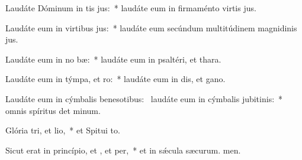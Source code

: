 \item Laudáte Dóminum in tis jus:~* laudáte eum in firmaménto virtis jus.
\item Laudáte eum in virtibus jus:~* laudáte eum secúndum multitúdinem magnidinis jus.
\item Laudáte eum in no bæ:~* laudáte eum in psaltéri, et thara.
\item Laudáte eum in týmpa, et ro:~* laudáte eum in dis, et gano.
\item Laudáte eum in cýmbalis benesotibus:~\pscross{} laudáte eum in cýmbalis jubitinis:~* omnis spíritus det minum.
\item Glória tri, et lio,~* et Spitui to.
\item Sicut erat in princípio, et , et per,~* et in sǽcula sæcurum. men.
